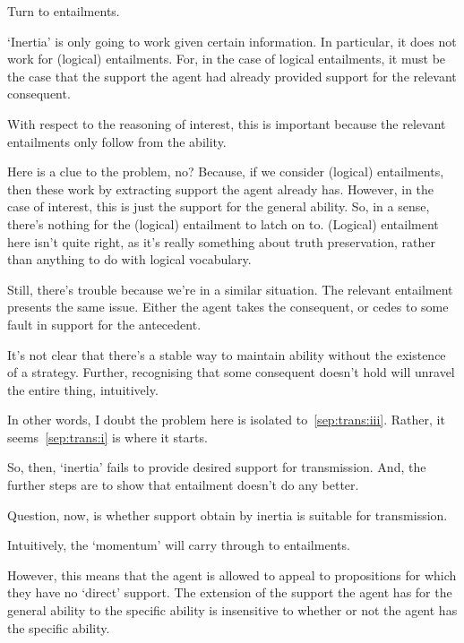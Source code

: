 \documentclass[10pt]{article}
\begin{document}
\begin{note}
  Turn to entailments.

  `Inertia' is only going to work given certain information.
  In particular, it does not work for (logical) entailments.
  For, in the case of logical entailments, it must be the case that the support the agent had already provided support for the relevant consequent.

  With respect to the reasoning of interest, this is important because the relevant entailments only follow from the ability.

  {
    \color{red}
    Here is a clue to the problem, no?
    Because, if we consider (logical) entailments, then these work by extracting support the agent already has.
    However, in the case of interest, this is just the support for the general ability.
    So, in a sense, there's nothing for the (logical) entailment to latch on to.
    (Logical) entailment here isn't quite right, as it's really something about truth preservation, rather than anything to do with logical vocabulary.
  }

  {
    \color{blue}
    Still, there's trouble because we're in a similar situation.
    The relevant entailment presents the same issue.
    Either the agent takes the consequent, or cedes to some fault in support for the antecedent.

    It's not clear that there's a stable way to maintain ability without the existence of a strategy.
    Further, recognising that some consequent doesn't hold will unravel the entire thing, intuitively.

    In other words, I doubt the problem here is isolated to~\ref{sep:trans:iii}.
    Rather, it seems~\ref{sep:trans:i} is where it starts.
  }

  {
    \color{green}
    So, then, `inertia' fails to provide desired support for transmission.
    And, the further steps are to show that entailment doesn't do any better.
  }
\end{note}

\begin{note}
  Question, now, is whether support obtain by inertia is suitable for transmission.

  Intuitively, the `momentum' will carry through to entailments.

  However, this means that the agent is allowed to appeal to propositions for which they have no `direct' support.
  The extension of the support the agent has for the general ability to the specific ability is insensitive to whether or not the agent has the specific ability.
  
\end{note}
\end{document}
